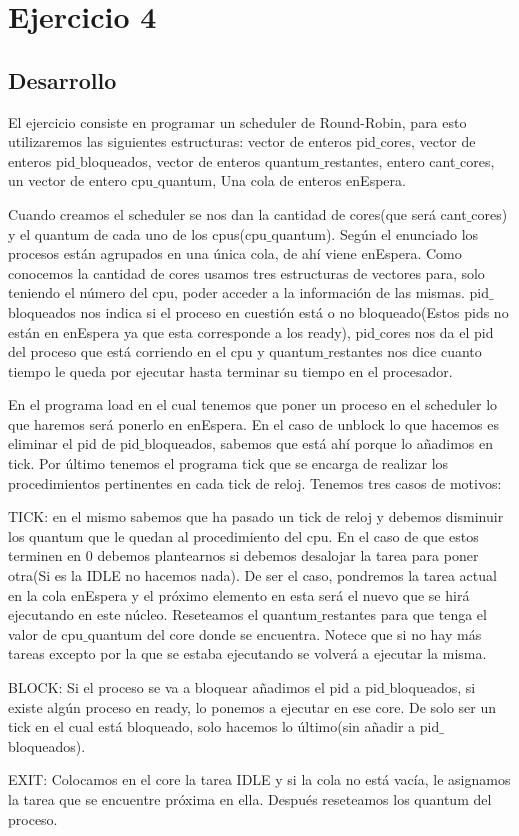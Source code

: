 \section{Ejercicio 4}

\subsection{Desarrollo}
El ejercicio consiste en programar un scheduler de Round-Robin, para esto utilizaremos las siguientes estructuras: vector de enteros pid$\_$cores, vector de enteros pid$\_$bloqueados, 
vector de enteros quantum$\_$restantes, entero cant$\_$cores, un vector de entero cpu$\_$quantum, Una cola de enteros enEspera.

Cuando creamos el scheduler se nos dan la cantidad de cores(que será cant$\_$cores) y el quantum de cada uno de los cpus(cpu$\_$quantum). Según el enunciado los procesos están agrupados 
en una única cola, de ahí viene enEspera. Como conocemos la cantidad de cores usamos tres estructuras de vectores para, solo teniendo el número del cpu, poder acceder a la 
información de las mismas. pid$\_$bloqueados nos indica si el proceso en cuestión está o no bloqueado(Estos pids no están en enEspera ya que esta corresponde a los
ready), pid$\_$cores nos da el pid del proceso que está corriendo en el cpu y quantum$\_$restantes nos dice cuanto tiempo le queda por ejecutar hasta terminar su tiempo en el 
procesador.

En el programa load en el cual tenemos que poner un proceso en el scheduler lo que haremos será ponerlo en enEspera. En el caso de unblock lo que hacemos es eliminar el pid de 
pid$\_$bloqueados, sabemos que está ahí porque lo añadimos en tick. Por último tenemos el programa tick que se encarga de realizar los procedimientos pertinentes en cada tick de reloj. Tenemos tres casos de motivos:
 
TICK: en el mismo sabemos que ha pasado un tick de reloj y debemos disminuir los quantum que le quedan al procedimiento del cpu. En el caso de que estos terminen en 0 debemos 
plantearnos si debemos desalojar la tarea para poner otra(Si es la IDLE no hacemos nada). De ser el caso, pondremos la tarea actual en la cola enEspera y el próximo elemento
en esta será el nuevo que se hirá ejecutando en este núcleo. Reseteamos el quantum$\_$restantes para que tenga el valor de cpu$\_$quantum del core donde se encuentra. Notece que si no hay más tareas
excepto por la que se estaba ejecutando se volverá a ejecutar la misma.

BLOCK: Si el proceso se va a bloquear añadimos el pid a pid$\_$bloqueados, si existe algún proceso en ready, lo ponemos a ejecutar en ese core. De solo ser un tick en el cual
está bloqueado, solo hacemos lo último(sin añadir a pid$\_$bloqueados).

EXIT: Colocamos en el core la tarea IDLE y si la cola no está vacía, le asignamos la tarea que se encuentre próxima en ella. Después reseteamos los quantum del proceso. 

